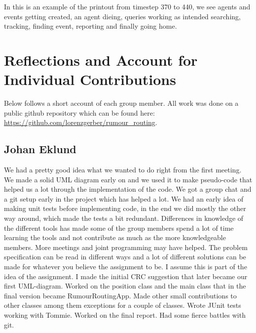 \documentclass[a4paper,11pt,twoside]{article}
\begin{document}
In this is an example of the printout from timestep 370 to 440, we see
agents and events getting created, an agent dieing, queries working as
intended searching, tracking, finding event, reporting and finally
going home.


\section{Reflections and Account for Individual Contributions}
Below follows a short account of each group member. All work was done
on a public github repository which can be found here: 
\url{https://github.com/lorenzgerber/rumour_routing}.

\subsection{Johan Eklund}
We had a pretty good idea what we wanted to do right from the first
meeting. We made a solid UML diagram early on and we used it to make
pseudo-code that helped us a lot through the implementation of the
code.
We got a group chat and a git setup early in the project which has
helped a lot.
We had an early idea of making unit tests before implementing code, in
the end we did mostly the other way around, which made the tests a bit
redundant.
Differences in knowledge of the different tools has made some of the
group members spend a lot of time learning the tools and not
contribute as much as the more knowledgeable members. More meetings
and joint programming may have helped.
The problem specification can be read in different ways and a lot of
different solutions can be made for whatever you believe the
assignment to be. I assume this is part of the idea of the assignment.
I made the initial CRC suggestion that later became our first
UML-diagram. Worked on the position class and the main class that in
the final version became RumourRoutingApp. Made other small
contributions to other classes among them exceptions for a couple of
classes. Wrote JUnit tests working with Tommie. Worked on the final
report. Had some fierce battles with git.
\end{document}
